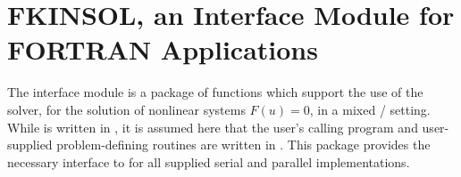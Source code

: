 \chapter{FKINSOL, an Interface Module for FORTRAN Applications}\label{s:fcmix}

The {\fkinsol} interface module is a package of {\CC} functions which support
the use of the {\kinsol} solver, for the solution of nonlinear systems
$F(u)=0$, in a mixed {\F}/{\CC} setting.  While {\kinsol} is written
in {\CC}, it is assumed here that the user's calling program and
user-supplied problem-defining routines are written in {\F}.
This package provides the necessary interface to {\kinsol} for all supplied
serial and parallel {\nvector} implementations.





